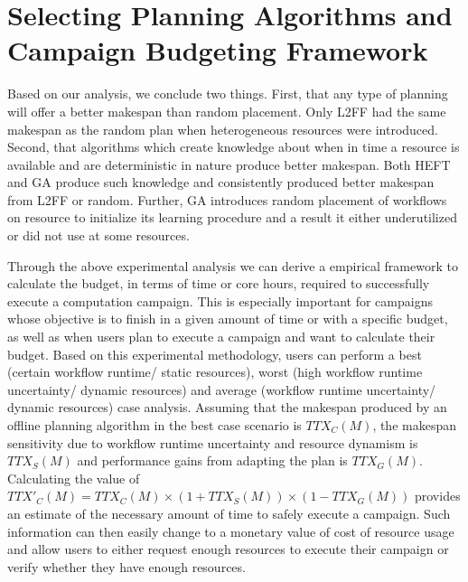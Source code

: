 \section{Selecting Planning Algorithms and Campaign Budgeting Framework}
\label{sec:cf_algo_sel}
Based on our analysis, we conclude two things.
First, that any type of planning will offer a better makespan than random placement.
Only L2FF had the same makespan as the random plan when heterogeneous resources were introduced.
Second, that algorithms which create knowledge about when in time a resource is available and are deterministic in nature produce better makespan.
Both HEFT and GA produce such knowledge and consistently produced better makespan from L2FF or random.
Further, GA introduces random placement of workflows on resource to initialize its learning procedure and a result it either underutilized or did not use at some resources.

Through the above experimental analysis we can derive a empirical framework to calculate the budget, in terms of time or core hours, required to successfully execute a computation campaign.
This is especially important for campaigns whose objective is to finish in a given amount of time or with a specific budget, as well as when users plan to execute a campaign and want to calculate their budget.
Based on this experimental methodology, users can perform a best (certain workflow runtime/ static resources), worst (high workflow runtime uncertainty/ dynamic resources) and average (workflow runtime uncertainty/ dynamic resources) case analysis.
Assuming that the makespan produced by an offline planning algorithm in the best case scenario is $TTX_{C}(M)$, the makespan sensitivity due to workflow runtime uncertainty and resource dynamism is $TTX_{S}(M)$ and performance gains from adapting the plan is $TTX_{G}(M)$.
Calculating the value of $TTX'_{C}(M) = TTX_{C}(M) \times (1 + TTX_{S}(M))\times ( 1 - TTX_{G}(M))$ provides an estimate of the necessary amount of time to safely execute a campaign.
Such information can then easily change to a monetary value of cost of resource usage and allow users to either request enough resources to execute their campaign or verify whether they have enough resources.


